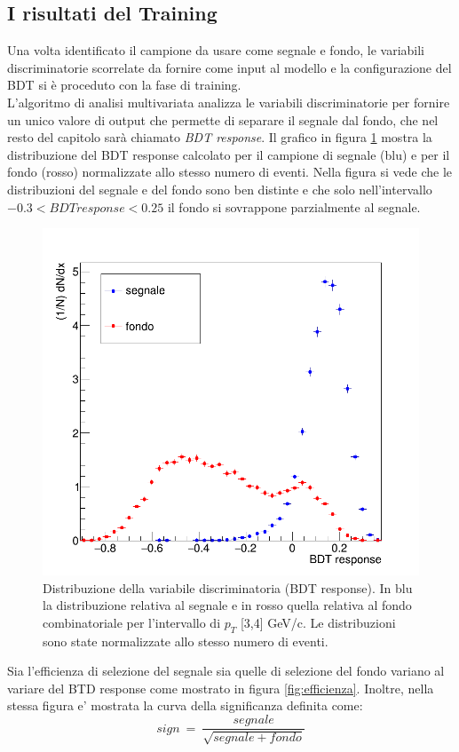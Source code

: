 \subsection{I risultati del Training}
Una volta identificato il campione da usare come segnale e fondo, le variabili discriminatorie scorrelate da fornire come input al modello e la configurazione del BDT si è proceduto con la fase di training. 
\\L'algoritmo di analisi multivariata analizza le variabili discriminatorie per fornire un unico valore di output che permette di separare il segnale dal fondo, che nel resto del capitolo sarà chiamato \textit{BDT response}. Il grafico in figura \ref{fig:BDTresponse} mostra la distribuzione del BDT response calcolato per il campione di segnale (blu) e per il fondo (rosso) normalizzate allo stesso numero di eventi. Nella figura si vede che le distribuzioni del segnale e del fondo sono ben distinte e che solo nell'intervallo $-0.3 < BDT response < 0.25$ il fondo si sovrappone parzialmente al segnale. 
    \begin{figure}[htbp] 
        \centering
        \includegraphics[width=0.7\linewidth]{training&testing/distribuzioneBDT_test.png}
        \caption{Distribuzione della variabile discriminatoria (BDT response). In blu la distribuzione relativa al segnale e in rosso quella relativa al fondo combinatoriale per l'intervallo di $p_T$ [3,4] GeV/c. Le distribuzioni sono state normalizzate allo stesso numero di eventi.} 
        \label{fig:BDTresponse}
    \end{figure}
    
    
Sia l'efficienza di selezione del segnale sia quelle di selezione del fondo variano al variare del BTD response come mostrato in figura \ref{fig:efficienza}. Inoltre, nella stessa figura e' mostrata la curva della significanza definita come:
    \begin{equation}
        sign \ = \ \frac{segnale}{\sqrt{segnale + fondo}}
    \end{equation}

